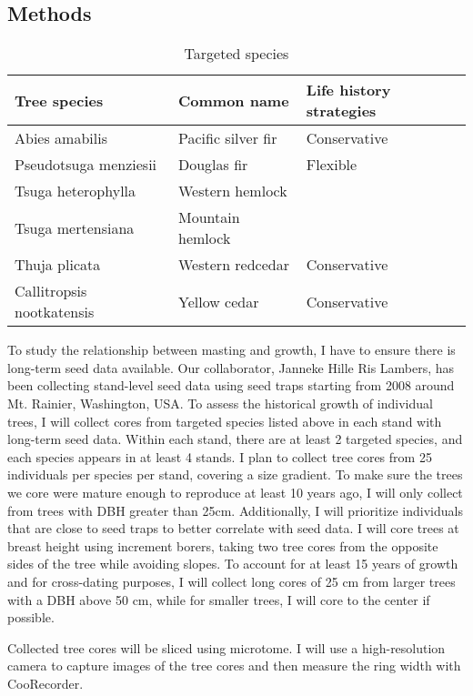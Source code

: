 \documentclass[11pt,letter]{article}
\begin{document}
\subsection{Methods}
\begin{table}[htb]
	\centering
	\small
	\caption{Targeted species}
\begin{tabular}{|p{5cm}|p{5cm}|p{5cm}|}
\hline
 Tree species & Common name & Life history strategies\\ \hline
Abies amabilis & Pacific silver fir & Conservative \\ \hline
Pseudotsuga menziesii & Douglas fir & Flexible    \\\hline
Tsuga heterophylla & Western hemlock &     \\\hline
Tsuga mertensiana & Mountain hemlock &     \\\hline
Thuja plicata & Western redcedar & Conservative    \\\hline
Callitropsis nootkatensis & Yellow cedar & Conservative    \\\hline

\end{tabular}

\end{table}
To study the relationship between masting and growth, I have to ensure there is long-term seed data available. Our collaborator, Janneke Hille Ris Lambers, has been collecting stand-level seed data using seed traps starting from 2008 around Mt. Rainier, Washington, USA. To assess the historical growth of individual trees, I will collect cores from targeted species listed above in each stand with long-term seed data. Within each stand, there are at least 2 targeted species, and each species appears in at least 4 stands. I plan to collect tree cores from 25 individuals per species per stand, covering a size gradient. To make sure the trees we core were mature enough to reproduce at least 10 years ago, I will only collect from trees with DBH greater than 25cm. Additionally, I will prioritize individuals that are close to seed traps to better correlate with seed data. I will core trees at breast height using increment borers, taking two tree cores from the opposite sides of the tree while avoiding slopes. To account for at least 15 years of growth and for cross-dating purposes, I will collect long cores of 25 cm from larger trees with a DBH above 50 cm, while for smaller trees, I will core to the center if possible.

Collected tree cores will be sliced using microtome. I  will use a high-resolution camera to capture images of the tree cores and then measure the ring width with CooRecorder.
\end{document}
